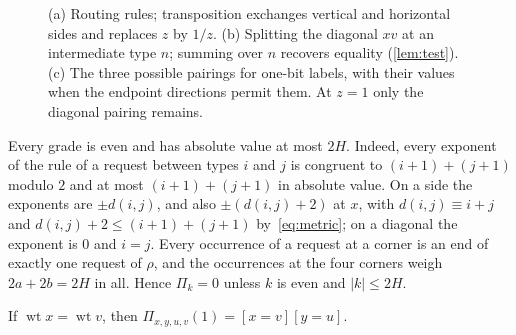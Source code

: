 \documentclass[11pt]{article}
\theoremstyle{definition}
\theoremstyle{definition}
\theoremstyle{remark}
\newcommand{\wt}{\operatorname{wt}}
\begin{document}
\begin{figure}[htb]
\caption{(a) Routing rules; transposition exchanges vertical and horizontal sides and replaces $z$ by $1/z$. (b) Splitting the diagonal $xv$ at an intermediate type $n$; summing over $n$ recovers equality (\cref{lem:test}). (c) The three possible pairings for one-bit labels, with their values when the endpoint directions permit them. At $z=1$ only the diagonal pairing remains.}
\label{fig:rules}
\end{figure}

Every grade is even and has absolute value at most $2H$. Indeed, every exponent of the rule of a request between types $i$ and $j$ is congruent to $(i+1)+(j+1)$ modulo $2$ and at most $(i+1)+(j+1)$ in absolute value. On a side the exponents are $\pm d(i,j)$, and also $\pm(d(i,j)+2)$ at $x$, with $d(i,j)\equiv i+j$ and $d(i,j)+2\le(i+1)+(j+1)$ by~\eqref{eq:metric}; on a diagonal the exponent is $0$ and $i=j$. Every occurrence of a request at a corner is an end of exactly one request of $\rho$, and the occurrences at the four corners weigh $2a+2b=2H$ in all. Hence $\Pi_k=0$ unless $k$ is even and $|k|\le2H$.

\begin{lemma}\label{lem:atone}
If $\wt x=\wt v$, then $\Pi_{x,y,u,v}(1)=[x=v][y=u]$.
\end{lemma}
\end{document}
